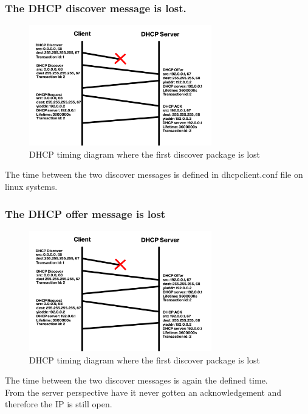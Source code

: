 \documentclass[12pt, a4paper]{article}
\begin{document}
			\subsubsection{The DHCP discover message is lost.}
				\begin{figure}[h!]
					\includegraphics[width=300px]{assets/dhcp1.png}
					\caption{DHCP timing diagram where the first discover package is lost}
				\end{figure}
				The time between the two discover messages is defined in dhcpclient.conf file on linux systems.
			\subsubsection{The DHCP offer message is lost}
				\begin{figure}[h!]
					\includegraphics[width=300px]{assets/dhcp1.png}
					\caption{DHCP timing diagram where the first discover package is lost}
				\end{figure}
				The time between the two discover messages is again the defined time.\\
				From the server perspective have it never gotten an acknowledgement and therefore the IP is still open.
				
			
			 
\end{document}
